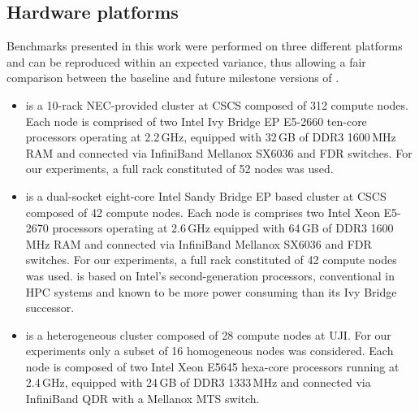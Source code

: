 \subsection{Hardware platforms}
\label{subsec:3.1}

Benchmarks presented  in this work  were performed on  three different
platforms  and can  be reproduced  within an  expected  variance, thus
allowing a  fair comparison between the baseline  and future milestone
versions of \cosmoart.

\begin{itemize}
\item \monch is  a 10-rack NEC-provided clus\-ter at  CSCS composed of
  312 compute nodes. 
  Each node is  comprised of two Intel Ivy  Bridge EP E5-2660 ten-core
  processors  operating  at 2.2\,GHz,  equipped  with  32\,GB of  DDR3
  1600\,MHz RAM  and connected via InfiniBand Mellanox  SX6036 and FDR
  switches. For our  experiments, a full rack constituted  of 52 nodes
  was used. 

\item \pilat is  a dual-socket eight-core Intel Sandy  Bridge EP based
  cluster at CSCS composed of 42 compute nodes.  
  Each node  is comprises two Intel Xeon  E5-2670 processors operating
  at 2.6\,GHz equipped with 64\,GB of DDR3 1600\,MHz RAM and connected
  via  InfiniBand   Mellanox  SX6036   and  FDR  switches.    For  our
  experiments, a full  rack constituted of 42 compute  nodes was used.
  \pilat   is   based   on   Intel's   second-generation   processors,
  conventional in  HPC systems  and known to  be more  power consuming
  than its Ivy Bridge successor.

\item \tinto is  a heterogeneous cluster composed of  28 compute nodes
  at UJI.  For our experiments only  a subset of  16 homogeneous nodes
  was  considered. Each  node  is  composed of  two  Intel Xeon  E5645
  hexa-core processors  running at  2.4\,GHz, equipped with  24\,GB of
  DDR3  1333\,MHz and  connected via  InfiniBand QDR  with  a Mellanox
  MTS switch.
\end{itemize}

